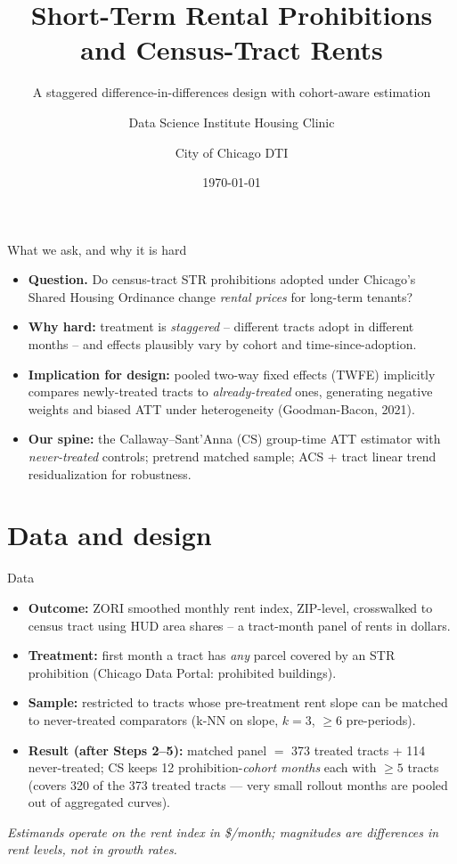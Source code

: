 \documentclass[11pt,aspectratio=169]{beamer}
\title[STR prohibitions and rents]{Short-Term Rental Prohibitions and Census-Tract Rents}
\subtitle{A staggered difference-in-differences design with cohort-aware estimation}
\author[DSI Housing]{Data Science Institute Housing Clinic \and City of Chicago DTI}
\date{\today}
\begin{document}
\begin{frame}[plain]
  \titlepage
\end{frame}

\begin{frame}{What we ask, and why it is hard}
\begin{itemize}
  \item \textbf{Question.} Do census-tract STR prohibitions adopted under Chicago's Shared Housing Ordinance change \emph{rental prices} for long-term tenants?
  \item \textbf{Why hard:} treatment is \emph{staggered} -- different tracts adopt in different months -- and effects plausibly vary by cohort and time-since-adoption.
  \item \textbf{Implication for design:} pooled two-way fixed effects (TWFE) implicitly compares newly-treated tracts to \emph{already-treated} ones, generating negative weights and biased ATT under heterogeneity (Goodman-Bacon, 2021).
  \item \textbf{Our spine:} the Callaway--Sant'Anna (CS) group-time ATT estimator with \emph{never-treated} controls; pretrend matched sample; ACS + tract linear trend residualization for robustness.
\end{itemize}
\end{frame}

\section{Data and design}

\begin{frame}{Data}
\begin{itemize}
  \item \textbf{Outcome:} ZORI smoothed monthly rent index, ZIP-level, crosswalked to census tract using HUD area shares -- a tract-month panel of rents in dollars.
  \item \textbf{Treatment:} first month a tract has \emph{any} parcel covered by an STR prohibition (Chicago Data Portal: prohibited buildings).
  \item \textbf{Sample:} restricted to tracts whose pre-treatment rent slope can be matched to never-treated comparators (k-NN on slope, $k=3$, $\geq 6$ pre-periods).
  \item \textbf{Result (after Steps 2--5):} matched panel $=$ 373 treated tracts + 114 never-treated; CS keeps 12 prohibition-\emph{cohort months} each with $\geq 5$ tracts (covers 320 of the 373 treated tracts --- very small rollout months are pooled out of aggregated curves).
\end{itemize}
\vfill
{\footnotesize\textit{Estimands operate on the rent index in \$/month; magnitudes are differences in rent levels, not in growth rates.}}
\end{frame}
\end{document}
